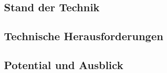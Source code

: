 
\subsection{Stand der Technik}\label{sec:VRStandDerTechnik}


\subsection{Technische Herausforderungen}\label{sec:VRHerausforderungen}


\subsection{Potential und Ausblick}\label{sec:VRPotentialUndAusblick}




